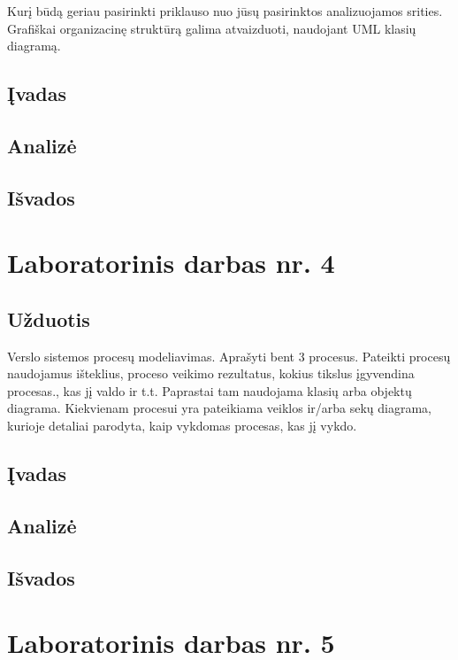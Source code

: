 \documentclass[10pt]{IEEEtran}
\begin{document}
            Kurį būdą geriau pasirinkti priklauso nuo jūsų pasirinktos analizuojamos srities. Grafiškai organizacinę struktūrą galima atvaizduoti, naudojant UML klasių diagramą.

        \subsection{Įvadas}

        \subsection{Analizė}

        \subsection{Išvados}

    \section{Laboratorinis darbas nr. 4}

        \subsection{Užduotis}

            Verslo sistemos procesų modeliavimas. Aprašyti bent 3 procesus. Pateikti procesų naudojamus išteklius, proceso veikimo rezultatus, kokius tikslus įgyvendina procesas., kas jį valdo ir t.t. Paprastai tam naudojama klasių arba objektų diagrama. Kiekvienam procesui yra pateikiama veiklos ir/arba sekų diagrama, kurioje detaliai parodyta, kaip vykdomas procesas, kas jį vykdo.

        \subsection{Įvadas}

        \subsection{Analizė}

        \subsection{Išvados}

    \section{Laboratorinis darbas nr. 5}
\end{document}

